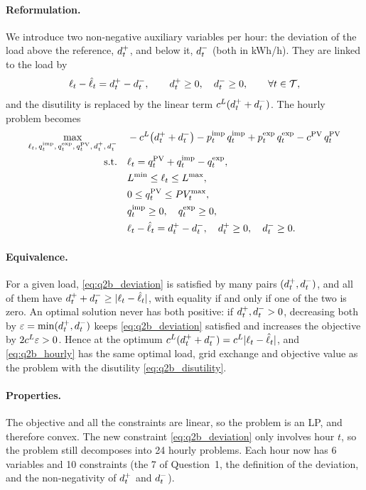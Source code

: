 \paragraph{Reformulation.}
We introduce two non-negative auxiliary variables per hour: the deviation of the load above
the reference, $d^{+}_{t}$, and below it, $d^{-}_{t}$ (both in kWh/h). They are linked to the load by
\begin{equation}
    \ell_{t} - \hat{\ell}_{t} = d^{+}_{t} - d^{-}_{t}, \qquad d^{+}_{t} \geq 0, \quad d^{-}_{t} \geq 0, \qquad \forall t \in \mathcal{T},
    \label{eq:q2b_deviation}
\end{equation}
and the disutility is replaced by the linear term $c^{L} (d^{+}_{t} + d^{-}_{t})$. The hourly problem
becomes
\begin{align}
    \max_{\ell_{t},\, q^{\mathrm{imp}}_{t},\, q^{\mathrm{exp}}_{t},\, q^{\mathrm{PV}}_{t},\, d^{+}_{t},\, d^{-}_{t}} \quad
    & - c^{L} \big( d^{+}_{t} + d^{-}_{t} \big) - p^{\mathrm{imp}}_{t} \, q^{\mathrm{imp}}_{t} + p^{\mathrm{exp}}_{t} \, q^{\mathrm{exp}}_{t} - c^{\mathrm{PV}} \, q^{\mathrm{PV}}_{t}
    \label{eq:q2b_hourly} \\
    \text{s.t.} \quad
    & \ell_{t} = q^{\mathrm{PV}}_{t} + q^{\mathrm{imp}}_{t} - q^{\mathrm{exp}}_{t}, \nonumber \\
    & L^{\min} \leq \ell_{t} \leq L^{\max}, \nonumber \\
    & 0 \leq q^{\mathrm{PV}}_{t} \leq PV_{t}^{\max}, \nonumber \\
    & q^{\mathrm{imp}}_{t} \geq 0, \quad q^{\mathrm{exp}}_{t} \geq 0, \nonumber \\
    & \ell_{t} - \hat{\ell}_{t} = d^{+}_{t} - d^{-}_{t}, \quad d^{+}_{t} \geq 0, \quad d^{-}_{t} \geq 0. \nonumber
\end{align}

\paragraph{Equivalence.}
For a given load, \eqref{eq:q2b_deviation} is satisfied by many pairs $(d^{+}_{t}, d^{-}_{t})$, and all
of them have $d^{+}_{t} + d^{-}_{t} \geq |\ell_{t} - \hat{\ell}_{t}|$, with equality if and only if one of the two is
zero. An optimal solution never has both positive: if $d^{+}_{t}, d^{-}_{t} > 0$, decreasing both by
$\varepsilon = \min(d^{+}_{t}, d^{-}_{t})$ keeps \eqref{eq:q2b_deviation} satisfied and increases the
objective by $2 c^{L} \varepsilon > 0$. Hence at the optimum $c^{L}(d^{+}_{t} + d^{-}_{t}) = c^{L} |\ell_{t} - \hat{\ell}_{t}|$,
and \eqref{eq:q2b_hourly} has the same optimal load, grid exchange and objective value as the
problem with the disutility \eqref{eq:q2b_disutility}.

\paragraph{Properties.}
The objective and all the constraints are linear, so the problem is an LP, and therefore
convex. The new constraint \eqref{eq:q2b_deviation} only involves hour $t$, so the problem still
decomposes into 24 hourly problems. Each hour now has 6 variables and 10 constraints (the 7 of
Question~1, the definition of the deviation, and the non-negativity of $d^{+}_{t}$ and $d^{-}_{t}$).

